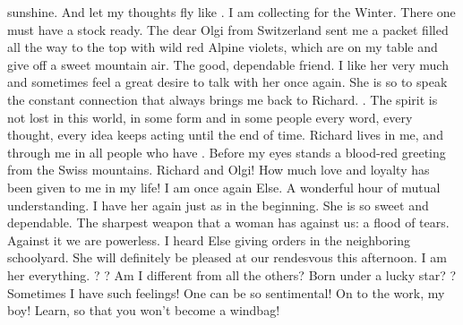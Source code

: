 sunshine. And let my thoughts fly like . I am collecting for the Winter. There one must have a stock ready. The dear Olgi from Switzerland sent me a packet filled all the way to the top with wild red Alpine violets, which are on my table and give off a sweet mountain air. The good, dependable friend. I like her very much and sometimes feel a great desire to talk with her once again. She is so to speak the constant connection that always brings me back to Richard. . The spirit is not lost in this world, in some form and in some people every word, every thought, every idea keeps acting until the end of time. Richard lives in me, and through me in all people who have . Before my eyes stands a blood-red greeting from the Swiss mountains. Richard and Olgi! How much love and loyalty has been given to me in my life! I am once again  Else. A wonderful hour of mutual understanding. I have her again just as in the beginning. She is so sweet and dependable. The sharpest weapon that a woman has against us: a flood of tears. Against it we are powerless. I heard Else giving orders in the neighboring schoolyard. She will definitely be pleased at our rendesvous this afternoon. I am her everything. ? ? Am I different from all the others? Born under a lucky star? ? Sometimes I have such feelings! One can be so sentimental! On to the work, my boy! Learn, so that you won't become a windbag! 


